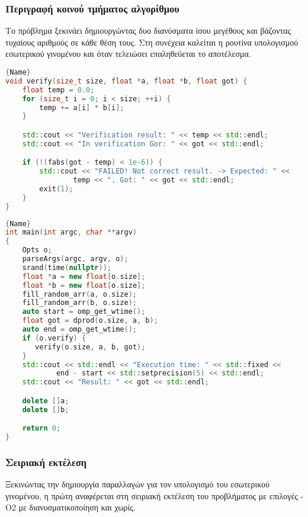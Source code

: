 \subsubsection{Περιγραφή κοινού τμήματος αλγορίθμου }
Το πρόβλημα ξεκινάει δημιουργώντας δυο διανύσματα ίσου μεγέθους και βάζοντας τυχαίους αριθμούς σε κάθε θέση τους. Στη συνέχεια καλείται η ρουτίνα υπολογισμού εσωτερικού γινομένου και όταν τελειώσει επαληθεύεται το αποτέλεσμα.
\begin{spacing}{0.8}
\begin{lstlisting}[showstringspaces=false, language=C++, caption={\en{DotProd: verify()}}, frame=tb]{Name}
void verify(size_t size, float *a, float *b, float got) {
    float temp = 0.0;
    for (size_t i = 0; i < size; ++i) {
        temp += a[i] * b[i];
    }

    std::cout << "Verification result: " << temp << std::endl;
    std::cout << "In verification Gor: " << got << std::endl;

    if (!(fabs(got - temp) < 1e-6)) {
        std::cout << "FAILED! Not correct result. -> Expected: " <<
        		temp << ". Got: " << got << std::endl;
        exit(1);
    }
}
\end{lstlisting}

\begin{lstlisting}[showstringspaces=false, language=C++, caption={\en{DotProd: main()}}, frame=tb]{Name}
int main(int argc, char **argv)
{
    Opts o;
    parseArgs(argc, argv, o);
    srand(time(nullptr));
    float *a = new float[o.size];
    float *b = new float[o.size];
    fill_random_arr(a, o.size);
    fill_random_arr(b, o.size);    
    auto start = omp_get_wtime();
    float got = dprod(o.size, a, b);
    auto end = omp_get_wtime();
    if (o.verify) {
       verify(o.size, a, b, got);
    }
    std::cout << std::endl << "Execution time: " << std::fixed <<
    		end - start << std::setprecision(5) << std::endl;
    std::cout << "Result: " << got << std::endl;

    delete []a;
    delete []b;

    return 0;
}
\end{lstlisting}
\end{spacing}
\clearpage
\subsubsection{Σειριακή εκτέλεση}
Ξεκινώντας την δημιουργία παραλλαγών για τον υπολογισμό του εσωτερικού γινομένου, η πρώτη 
αναφέρεται στη σειριακή εκτέλεση του προβλήματος με επιλογές -O2 με διανυσματικοποίηση και χωρίς.

